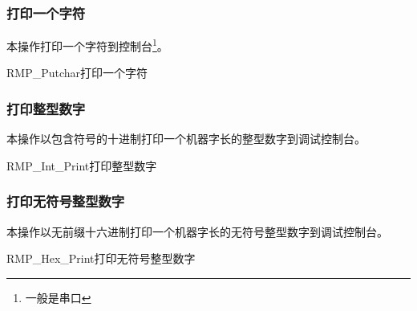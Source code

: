 \subsubsection{打印一个字符}\label{subsubsec:print-one-character}

本操作打印一个字符到控制台\footnote{一般是串口}。

\begin{apidesc}{RMP\_Putchar}{打印一个字符}
    \begin{apiparams}
    \end{apiparams}
    \begin{apiret}
    \end{apiret}
\end{apidesc}

\subsubsection{打印整型数字}\label{subsubsec:print-a-signed-integer}

本操作以包含符号的十进制打印一个机器字长的整型数字到调试控制台。

\begin{apidesc}{RMP\_Int\_Print}{打印整型数字}
    \begin{apiparams}
    \end{apiparams}
    \begin{apiret}
    \end{apiret}
\end{apidesc}

\subsubsection{打印无符号整型数字}\label{subsubsec:print-an-unsigned-integer}

本操作以无前缀十六进制打印一个机器字长的无符号整型数字到调试控制台。

\begin{apidesc}{RMP\_Hex\_Print}{打印无符号整型数字}
    \begin{apiparams}
    \end{apiparams}
    \begin{apiret}
    \end{apiret}
\end{apidesc}

